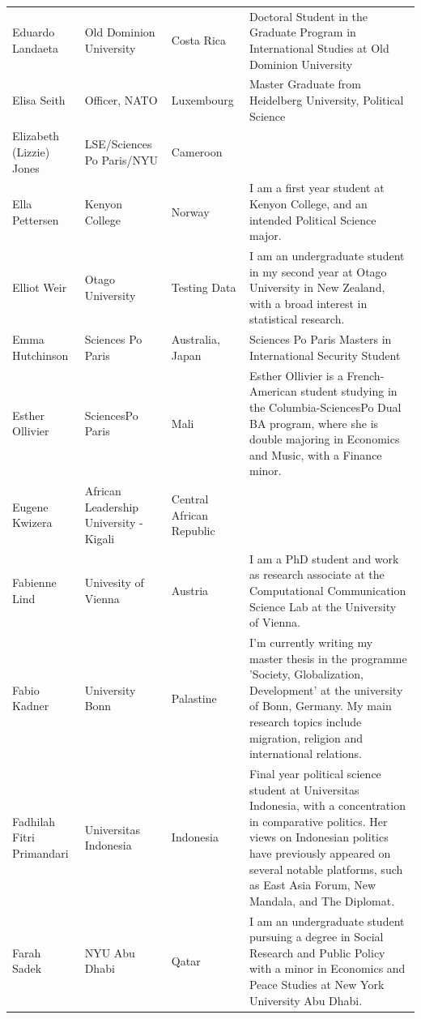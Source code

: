\documentclass[]{article}
\begin{document}
\begin{longtable}{l>{\raggedright\arraybackslash}p{2cm}>{\raggedright\arraybackslash}p{2cm}>{\raggedright\arraybackslash}p{3cm}}
\rowcolor{gray!6}  Eduardo Landaeta & Old Dominion University & Costa Rica & Doctoral Student in the Graduate Program in International Studies at Old Dominion University\\
Elisa Seith & Officer, NATO & Luxembourg & Master Graduate from Heidelberg University, Political Science\\
\rowcolor{gray!6}  Elizabeth (Lizzie) Jones & LSE/Sciences Po Paris/NYU & Cameroon & \\
\addlinespace
Ella Pettersen & Kenyon College & Norway & I am a first year student at Kenyon College, and an intended Political Science major.\\
\rowcolor{gray!6}  Elliot Weir & Otago University & Testing Data & I am an undergraduate student in my second year at Otago University in New Zealand, with a broad interest in statistical research.\\
Emma Hutchinson & Sciences Po Paris & Australia, Japan & Sciences Po Paris Masters in International Security Student\\
\rowcolor{gray!6}  Esther Ollivier & SciencesPo Paris & Mali & Esther Ollivier is a French-American student studying in the Columbia-SciencesPo Dual BA program, where she is double majoring in Economics and Music, with a Finance minor.\\
Eugene Kwizera & African Leadership University - Kigali & Central African Republic & \\
\addlinespace
\rowcolor{gray!6}  Fabienne Lind & Univesity of Vienna & Austria & I am a PhD student and work as research associate at the Computational Communication Science Lab at the University of Vienna.\\
Fabio Kadner & University Bonn & Palastine & I'm currently writing my master thesis in the programme 'Society, Globalization, Development' at the university of Bonn, Germany. My main research topics include migration, religion and international relations.\\
\rowcolor{gray!6}  Fadhilah Fitri Primandari & Universitas Indonesia & Indonesia & Final year political science student at Universitas Indonesia, with a concentration in comparative politics. Her views on Indonesian politics have previously appeared on several notable platforms, such as East Asia Forum, New Mandala, and The Diplomat.\\
Farah Sadek & NYU Abu Dhabi & Qatar & I am an undergraduate student pursuing a degree in Social Research and Public Policy with a minor in Economics and Peace Studies at New York University Abu Dhabi.\\

\end{longtable}
\end{document}
